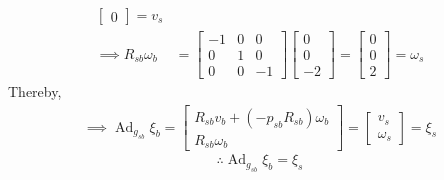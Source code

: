 \begin{align*}
\begin{bmatrix}
        0
    \end{bmatrix}
    =
    v_s
    \\
    \implies
    R_{s b} \omega_b
     & =
    \begin{bmatrix}
        -1 & 0 & 0  \\
        0  & 1 & 0  \\
        0  & 0 & -1
    \end{bmatrix}
    \begin{bmatrix}
        0 \\
        0 \\
        -2
    \end{bmatrix}
    =
    \begin{bmatrix}
        0 \\
        0 \\
        2
    \end{bmatrix}
    =
    \omega_s
\end{align*}
Thereby,
\begin{align*}
    \implies
    \operatorname{Ad}_{g_{s b}} \xi_{b}
    =
    \begin{bmatrix}
        R_{s b} v_b + (- \widehat{p}_{s b} R_{s b}) \omega_b \\
        R_{s b} \omega_b
    \end{bmatrix}
    =
    \begin{bmatrix}
        v_s \\
        \omega_s
    \end{bmatrix}
    =
    \xi_s
\end{align*}
\begin{equation*}
    \therefore
    \boxed{
    \operatorname{Ad}_{g_{s b}} \xi_{b}
    =
    \xi_s
    }
\end{equation*}
